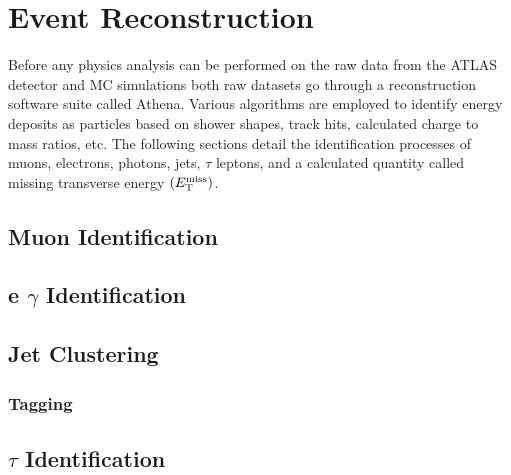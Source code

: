 \chapter{Event Reconstruction}\label{chap:reco}
	Before any physics analysis can be performed on the raw data from the ATLAS detector and MC simulations both raw datasets go through a reconstruction software suite called Athena. Various algorithms are employed to identify energy deposits as particles based on shower shapes, track hits, calculated charge to mass ratios, etc. The following sections detail the identification processes of muons, electrons, photons, jets, $\tau$ leptons, and a calculated quantity called missing transverse energy $(E_\text{T}^\text{miss})$.

	\section{Muon Identification}\label{sec:reco-muon}

	\section{e $\gamma$ Identification}\label{sec:reco-egamma}

	\section{Jet Clustering}\label{sec:reco-jets}

		\subsection{\bjet Tagging}\label{ssec:flavor-tagging}

	\section{$\tau$ Identification}\label{ssec:reco-tau}

	\section{\Etm}\label{sec:reco-etmiss}
		